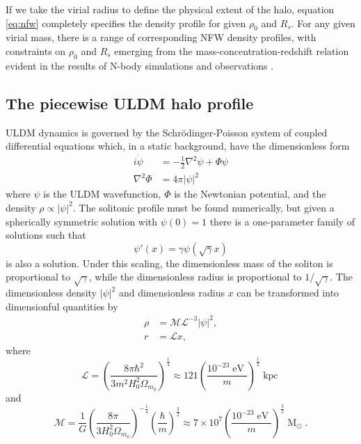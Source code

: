 \documentclass[a4paper,11pt]{article}
\begin{document}
If we take the virial radius to define the  physical extent of the halo, equation \ref{eq:nfw} completely specifies the density profile for given  $\rho_0$ and $R_s$. For any given virial mass, there is a range of corresponding NFW density profiles, with constraints on $\rho_0$ and $R_s$ emerging from the mass-concentration-redshift relation evident in the results of N-body simulations and observations \cite{Ludlow:2013vxa, Ragagnin:2018enf}. 

\subsection{The piecewise ULDM halo profile}

ULDM dynamics is governed by the Schr{\"o}dinger-Poisson system of coupled differential equations which, in a static background, have the dimensionless form  
%
\begin{align}
    i\dot{\psi} &= -\frac{1}{2}\nabla^2\psi+\Phi\psi \\
    \nabla^2\Phi &= 4\pi \vert \psi\vert^2
\end{align}
%
where $\psi$ is the ULDM wavefunction, $\Phi$ is the Newtonian potential, and the density $\rho \propto |\psi|^2$. The solitonic profile must be found numerically, but  given a spherically symmetric  solution with $\psi(0)=1$ there is a one-parameter family of solutions such that
%
\begin{equation}
    \psi'(x) = \gamma\psi(\sqrt{\gamma}x)
\end{equation}
is also a solution.  Under this scaling, the dimensionless mass of the soliton is proportional to $\sqrt{\gamma}$, while the dimensionless radius is proportional to $1/\sqrt{\gamma}$. The dimensionless density $\vert\psi\vert^2$ and dimensionless radius $x$ can be transformed into dimensionful quantities by
\begin{align}
    \rho &= \mathcal{M}\mathcal{L}^{-3}\vert\psi\vert^2, \label{eq:density_conv} \\
    r &= \mathcal{L}x, \label{eq:mass_conv}
\end{align}
where
\begin{equation}\label{eq:length}
    \mathcal{L}=\left(\frac{8\pi\hbar^2}{3 m^2H_0^2\Omega_{m_0}}\right)^{\frac{1}{4}}\approx121\left(\frac{10^{-23}\operatorname{eV}}{m}\right)^{\frac{1}{2}}\operatorname{kpc}
\end{equation}
%
and 
%
\begin{equation}\label{eq:mass}
    \mathcal{M}=\frac{1}{G}\left(\frac{8\pi}{3 H_0^2\Omega_{m_0}}\right)^{-\frac{1}{4}}\left(\frac{\hbar}{m}\right)^{\frac{3}{2}}\approx 7\times 10^7\left(\frac{10^{-23}\operatorname{eV}}{m}\right)^{\frac{3}{2}}\operatorname{M}_{\odot}.
\end{equation}
\end{document}
